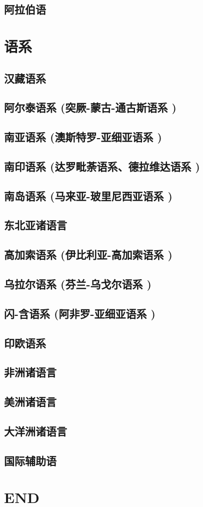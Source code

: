 \documentclass[UTF8]{../../RepresentationUniverse}
\begin{document}
\section{阿拉伯语}





\chapter{语系}

\section{汉藏语系}
\section{阿尔泰语系 (突厥-蒙古-通古斯语系 )}

\section{南亚语系 (澳斯特罗-亚细亚语系 )}
\section{南印语系 (达罗毗荼语系、德拉维达语系 )}
\section{南岛语系 (马来亚-玻里尼西亚语系 )}
\section{东北亚诸语言}
\section{高加索语系 (伊比利亚-高加索语系 )}
\section{乌拉尔语系 (芬兰-乌戈尔语系 )}
\section{闪-含语系 (阿非罗-亚细亚语系 )}
\section{印欧语系}

\section{非洲诸语言}
\section{美洲诸语言}
\section{大洋洲诸语言}
\section{国际辅助语}




\chapter{END}
\end{document}
